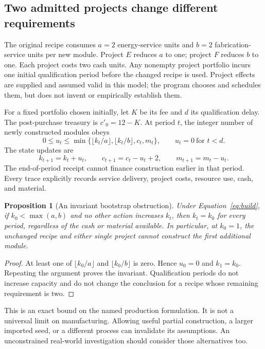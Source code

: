 \documentclass[11pt,letterpaper]{article}
\newcommand{\1}{\mathbf 1}
\newtheorem{proposition}{Proposition}[section]
\theoremstyle{remark}\newtheorem{remark}{Remark}[section]
\begin{document}
\subsection{Two admitted projects change different requirements}
The original recipe consumes $a=2$ energy-service units and $b=2$ fabrication-service units per new module. Project $E$ reduces $a$ to one; project $F$ reduces $b$ to one. Each project costs two cash units. Any nonempty project portfolio incurs one initial qualification period before the changed recipe is used. Project effects are supplied and assumed valid in this model; the program chooses and schedules them, but does not invent or empirically establish them.

For a fixed portfolio chosen initially, let $K$ be its fee and $d$ its qualification delay. The post-purchase treasury is $c'_0=12-K$. At period $t$, the integer number of newly constructed modules obeys
\begin{equation}\label{eq:build}
 0\le u_t\le \min\{\lfloor k_t/a\rfloor,\lfloor k_t/b\rfloor,c_t,m_t\},
 \qquad u_t=0\ \text{for }t<d.
\end{equation}
The state updates are
\begin{equation}\label{eq:finiteupdate}
 k_{t+1}=k_t+u_t,\qquad c_{t+1}=c_t-u_t+2,\qquad m_{t+1}=m_t-u_t.
\end{equation}
The end-of-period receipt cannot finance construction earlier in that period. Every trace explicitly records service delivery, project costs, resource use, cash, and material.

\begin{proposition}[An invariant bootstrap obstruction]\label{prop:bootstrap}
Under Equation~\eqref{eq:build}, if $k_0<\max(a,b)$ and no other action increases $k_t$, then $k_t=k_0$ for every period, regardless of the cash or material available. In particular, at $k_0=1$, the unchanged recipe and either single project cannot construct the first additional module.
\end{proposition}
\begin{proof}
At least one of $\lfloor k_0/a\rfloor$ and $\lfloor k_0/b\rfloor$ is zero. Hence $u_0=0$ and $k_1=k_0$. Repeating the argument proves the invariant. Qualification periods do not increase capacity and do not change the conclusion for a recipe whose remaining requirement is two.
\end{proof}

This is an exact bound on the named production formulation. It is not a universal limit on manufacturing. Allowing useful partial construction, a larger imported seed, or a different process can invalidate its assumptions. An unconstrained real-world investigation should consider those alternatives too.
\end{document}
